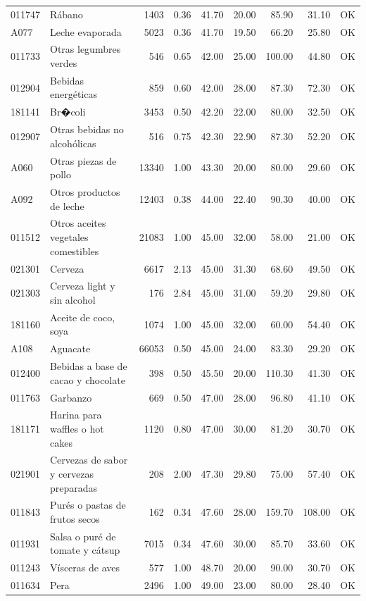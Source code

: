 \begin{table}[ht]
\begin{tabular}{llrrrrrrl}
  011747 & Rábano & 1403 & 0.36 & 41.70 & 20.00 & 85.90 & 31.10 & OK \\ 
  A077 & Leche evaporada & 5023 & 0.36 & 41.70 & 19.50 & 66.20 & 25.80 & OK \\ 
  011733 & Otras legumbres verdes & 546 & 0.65 & 42.00 & 25.00 & 100.00 & 44.80 & OK \\ 
  012904 & Bebidas energéticas & 859 & 0.60 & 42.00 & 28.00 & 87.30 & 72.30 & OK \\ 
  181141 & Br�coli & 3453 & 0.50 & 42.20 & 22.00 & 80.00 & 32.50 & OK \\ 
  012907 & Otras bebidas no alcohólicas & 516 & 0.75 & 42.30 & 22.90 & 87.30 & 52.20 & OK \\ 
  A060 & Otras piezas de pollo & 13340 & 1.00 & 43.30 & 20.00 & 80.00 & 29.60 & OK \\ 
  A092 & Otros productos de leche & 12403 & 0.38 & 44.00 & 22.40 & 90.30 & 40.00 & OK \\ 
  011512 & Otros aceites vegetales comestibles & 21083 & 1.00 & 45.00 & 32.00 & 58.00 & 21.00 & OK \\ 
  021301 & Cerveza & 6617 & 2.13 & 45.00 & 31.30 & 68.60 & 49.50 & OK \\ 
  021303 & Cerveza light y sin alcohol & 176 & 2.84 & 45.00 & 31.00 & 59.20 & 29.80 & OK \\ 
  181160 & Aceite de coco, soya & 1074 & 1.00 & 45.00 & 32.00 & 60.00 & 54.40 & OK \\ 
  A108 & Aguacate & 66053 & 0.50 & 45.00 & 24.00 & 83.30 & 29.20 & OK \\ 
  012400 & Bebidas a base de cacao y chocolate & 398 & 0.50 & 45.50 & 20.00 & 110.30 & 41.30 & OK \\ 
  011763 & Garbanzo & 669 & 0.50 & 47.00 & 28.00 & 96.80 & 41.10 & OK \\ 
  181171 & Harina para waffles o hot cakes & 1120 & 0.80 & 47.00 & 30.00 & 81.20 & 30.70 & OK \\ 
  021901 & Cervezas de sabor y cervezas preparadas & 208 & 2.00 & 47.30 & 29.80 & 75.00 & 57.40 & OK \\ 
  011843 & Purés o pastas de frutos secos & 162 & 0.34 & 47.60 & 28.00 & 159.70 & 108.00 & OK \\ 
  011931 & Salsa o puré de tomate y cátsup & 7015 & 0.34 & 47.60 & 30.00 & 85.70 & 33.60 & OK \\ 
  011243 & Vísceras de aves & 577 & 1.00 & 48.70 & 20.00 & 90.00 & 30.70 & OK \\ 
  011634 & Pera & 2496 & 1.00 & 49.00 & 23.00 & 80.00 & 28.40 & OK \\ 

\end{tabular}
\end{table}
